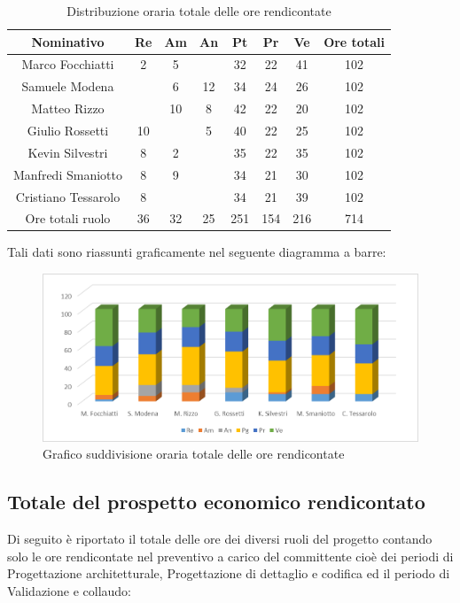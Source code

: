 \documentclass[./PianodiProgetto.tex]{subfiles}
\begin{document}
\begin{table}[H]
	\centering
	\begin{tabular}{|c|cccccc|c|}
		\hline
		Nominativo&Re&Am&An&Pt&Pr&Ve&Ore totali\\ \hline
		Marco Focchiatti&2&5& &32&22&41&102 \\ \hline
		Samuele Modena& &6&12&34&24&26&102 \\ \hline
		Matteo Rizzo& &10&8&42&22&20&102 \\ \hline
		Giulio Rossetti&10& &5&40&22&25&102 \\ \hline
		Kevin Silvestri&8&2& &35&22&35&102 \\ \hline
		Manfredi Smaniotto&8&9& &34&21&30&102 \\ \hline
		Cristiano Tessarolo&8& & &34&21&39&102 \\  \hline
		Ore totali ruolo&36&32&25&251&154&216&714 \\ \hline
	\end{tabular}
	\caption{Distribuzione oraria totale delle ore rendicontate}
\end{table}

Tali dati sono riassunti graficamente nel seguente diagramma a barre:
\begin{figure}[H]
	\centering
	\includegraphics[width=1\linewidth]{img/grafici/OreRendicontateProspettoOrario}
	\caption{Grafico suddivisione oraria totale delle ore rendicontate}
	\label{fig:ore-rendicontate-prospetto-orario}
\end{figure}

\subsection{Totale del prospetto economico rendicontato}
Di seguito è riportato il totale delle ore dei diversi ruoli del progetto contando solo le ore rendicontate nel preventivo a carico del committente cioè dei periodi di Progettazione architetturale, Progettazione di dettaglio e codifica ed il periodo di Validazione e collaudo:
\end{document}

